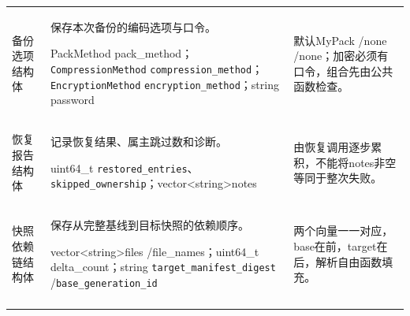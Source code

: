 \begin{longtable}{@{}L{.22\linewidth}L{.34\linewidth}L{.38\linewidth}@{}}
备份选项结构体\par{} & 保存本次备份的编码选项与口令。\par PackMethod pack\_method；\nolinkurl{CompressionMethod} \nolinkurl{compression\_method}；\nolinkurl{EncryptionMethod} \nolinkurl{encryption\_method}；string password & 默认MyPack /\allowbreak none /\allowbreak none；加密必须有口令，组合先由公共函数检查。\\\addlinespace[4pt]

恢复报告结构体\par{} & 记录恢复结果、属主跳过数和诊断。\par uint64\_t \nolinkurl{restored\_entries}、\nolinkurl{skipped\_ownership}；vector<\allowbreak string>\allowbreak  notes & 由恢复调用逐步累积，不能将notes非空等同于整次失败。\\\addlinespace[4pt]

快照依赖链结构体\par{} & 保存从完整基线到目标快照的依赖顺序。\par vector<\allowbreak string>\allowbreak  files /\allowbreak file\_names；uint64\_t delta\_count；string \nolinkurl{target\_manifest\_digest} /\allowbreak \nolinkurl{base\_generation\_id} & 两个向量一一对应，base在前，target在后，解析自由函数填充。\\\addlinespace[4pt]

\end{longtable}

